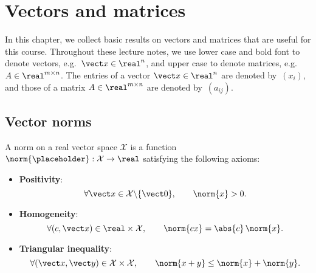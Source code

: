 \chapter{Vectors and matrices}%
\label{cha:vectors_and_matrices}

In this chapter,
we collect basic results on vectors and matrices that are useful for this course.
Throughout these lecture notes,
we use lower case and bold font to denote vectors, e.g.\ $\vect x \in \real^n$,
and upper case to denote matrices, e.g.\ $A \in \real^{m \times n}$.
The entries of a vector $\vect x \in \real^n$ are denoted by~$(x_i)$,
and those of a matrix $A \in \real^{m \times n}$ are denoted by~$(a_{ij})$.


\section{Vector norms}%
\label{sub:vector_norms}

A norm on a real vector space $\mathcal X$ is a function $\norm{\placeholder}: \mathcal X \to \real$ satisfying the following axioms:
\begin{itemize}
    \item
        \textbf{Positivity}:
        \[
            \forall \vect x \in \mathcal X \backslash \{\vect 0\}, \qquad
            \norm{x} > 0.
        \]

    \item
        \textbf{Homogeneity}:
        \[
            \forall (c, \vect x) \in \real \times \mathcal X, \qquad
            \norm{cx} = \abs{c} \, \norm{x} .
        \]

    \item
        \textbf{Triangular inequality}:
        \[
            \forall (\vect x, \vect y) \in \mathcal X \times \mathcal X, \qquad
            \norm{x + y} \leq \norm{x} + \norm{y}.
        \]
\end{itemize}

